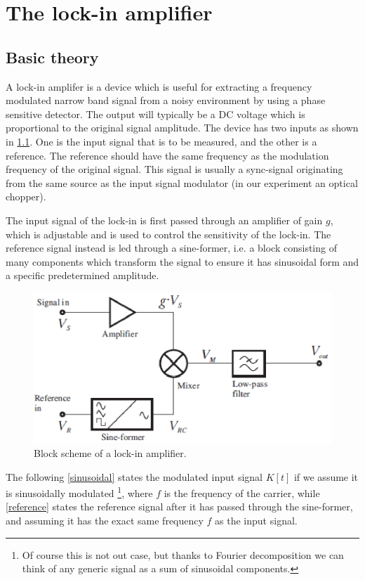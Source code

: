 \chapter{The lock-in amplifier}\label{lokkin}
	\section{Basic theory}



A lock-in amplifer is a device which is useful for extracting a frequency modulated narrow band signal from a noisy environment by using a phase sensitive detector. The output will typically be a DC voltage which is proportional to the original signal amplitude. The device has two inputs as shown in \cref{lockin1}. One is the input signal that is to be measured, and the other is a reference. The reference should have the same frequency as the modulation frequency of the original signal. This signal is usually a sync-signal originating from the same source as the input signal modulator (in our experiment an optical chopper). 

The input signal of the lock-in is first passed through an amplifier of gain $g$, which is adjustable and is used to control the sensitivity of the lock-in. The reference signal instead is led through a sine-former, i.e.  a block consisting of many components which transform the signal to ensure it has sinusoidal form and a specific predetermined amplitude.

\begin{figure}[!hbt]\centering
\includegraphics[width=\linewidth, draft=\foto]{eps/lockin1.eps}
\caption{Block scheme of a lock-in amplifier.}
\label{lockin1}
\end{figure}

The following \cref{sinusoidal} states the  modulated input signal $K[t]$ if we assume it is sinusoidally modulated \footnote{Of course this is not out case, but thanks to Fourier decomposition we can think of any generic signal as a sum of sinusoidal components.}, where $f$ is the frequency of the carrier, while \cref{reference} states the reference signal after it has passed through the sine-former, and assuming it has the exact same frequency $f$ as the input signal.

